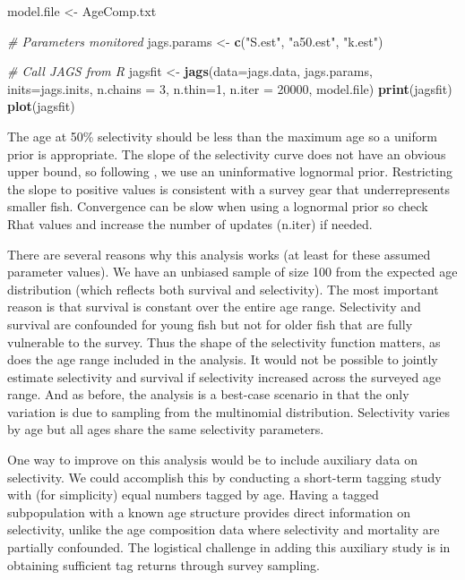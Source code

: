 \documentclass[
]{krantz}
\makeatletter
\newenvironment{Shaded}{\begin{snugshade}}{\end{snugshade}}
\newcommand{\AttributeTok}[1]{\textcolor[rgb]{0.27,0.27,0.27}{#1}}
\newcommand{\CommentTok}[1]{\textcolor[rgb]{0.37,0.37,0.37}{\textit{#1}}}
\newcommand{\DecValTok}[1]{\textcolor[rgb]{0.06,0.06,0.06}{#1}}
\newcommand{\FunctionTok}[1]{\textcolor[rgb]{0.27,0.27,0.27}{\textbf{#1}}}
\newcommand{\NormalTok}[1]{#1}
\newcommand{\OtherTok}[1]{\textcolor[rgb]{0.37,0.37,0.37}{#1}}
\newcommand{\StringTok}[1]{\textcolor[rgb]{0.5,0.5,0.5}{#1}}
\newenvironment{kframe}{%
\medskip{}
\setlength{\fboxsep}{.8em}
 \def\at@end@of@kframe{}%
 \ifinner\ifhmode%
  \def\at@end@of@kframe{\end{minipage}}%
  \begin{minipage}{\columnwidth}%
 \fi\fi%
 \def\FrameCommand##1{\hskip\@totalleftmargin \hskip-\fboxsep
 \colorbox{shadecolor}{##1}\hskip-\fboxsep
     \hskip-\linewidth \hskip-\@totalleftmargin \hskip\columnwidth}%
 \MakeFramed {\advance\hsize-\width
   \@totalleftmargin\z@ \linewidth\hsize
   \@setminipage}}%
 {\par\unskip\endMakeFramed%
 \at@end@of@kframe}
\renewenvironment{Shaded}{\begin{kframe}}{\end{kframe}}
\makeatother
\begin{document}
\begin{Shaded}
\begin{Highlighting}[]
\NormalTok{model.file }\OtherTok{\textless{}{-}} \StringTok{\textquotesingle{}AgeComp.txt\textquotesingle{}}

\CommentTok{\# Parameters monitored}
\NormalTok{jags.params }\OtherTok{\textless{}{-}} \FunctionTok{c}\NormalTok{(}\StringTok{"S.est"}\NormalTok{, }\StringTok{"a50.est"}\NormalTok{, }\StringTok{"k.est"}\NormalTok{)}

\CommentTok{\# Call JAGS from R}
\NormalTok{jagsfit }\OtherTok{\textless{}{-}} \FunctionTok{jags}\NormalTok{(}\AttributeTok{data=}\NormalTok{jags.data, jags.params, }\AttributeTok{inits=}\NormalTok{jags.inits,}
                \AttributeTok{n.chains =} \DecValTok{3}\NormalTok{, }\AttributeTok{n.thin=}\DecValTok{1}\NormalTok{, }\AttributeTok{n.iter =} \DecValTok{20000}\NormalTok{,}
\NormalTok{                model.file)}
\FunctionTok{print}\NormalTok{(jagsfit)}
\FunctionTok{plot}\NormalTok{(jagsfit)}
\end{Highlighting}
\end{Shaded}

The age at 50\% selectivity should be less than the maximum age so a uniform prior is appropriate. The slope of the selectivity curve does not have an obvious upper bound, so following \citet{mccarthy2007}, we use an uninformative lognormal prior. Restricting the slope to positive values is consistent with a survey gear that underrepresents smaller fish. Convergence can be slow when using a lognormal prior so check Rhat values and increase the number of updates (n.iter) if needed.

There are several reasons why this analysis works (at least for these assumed parameter values). We have an unbiased sample of size 100 from the expected age distribution (which reflects both survival and selectivity). The most important reason is that survival is constant over the entire age range. Selectivity and survival are confounded for young fish but not for older fish that are fully vulnerable to the survey. Thus the shape of the selectivity function matters, as does the age range included in the analysis. It would not be possible to jointly estimate selectivity and survival if selectivity increased across the surveyed age range. And as before, the analysis is a best-case scenario in that the only variation is due to sampling from the multinomial distribution. Selectivity varies by age but all ages share the same selectivity parameters.

One way to improve on this analysis would be to include auxiliary data on selectivity. We could accomplish this by conducting a short-term tagging study with (for simplicity) equal numbers tagged by age. Having a tagged subpopulation with a known age structure provides direct information on selectivity, unlike the age composition data where selectivity and mortality are partially confounded. The logistical challenge in adding this auxiliary study is in obtaining sufficient tag returns through survey sampling.
\end{document}
